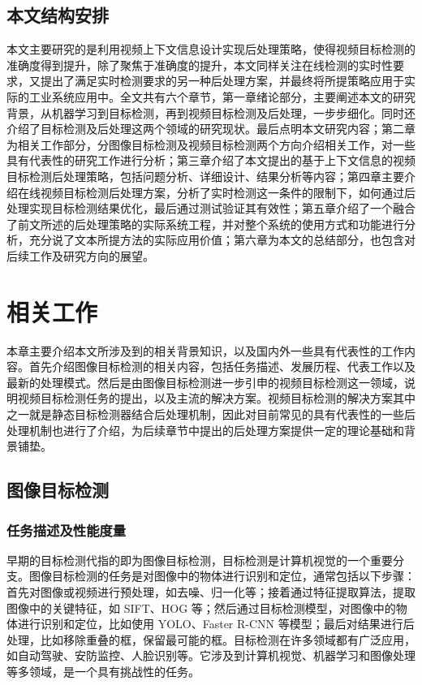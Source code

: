 \documentclass[winfonts,master,twoside,AutoFakeBold= {2}]{njuthesis}
\begin{document}
\section{本文结构安排}
本文主要研究的是利用视频上下文信息设计实现后处理策略，使得视频目标检测的准确度得到提升，除了聚焦于准确度的提升，本文同样关注在线检测的实时性要求，又提出了满足实时检测要求的另一种后处理方案，并最终将所提策略应用于实际的工业系统应用中。全文共有六个章节，第一章绪论部分，主要阐述本文的研究背景，从机器学习到目标检测，再到视频目标检测及后处理，一步步细化。同时还介绍了目标检测及后处理这两个领域的研究现状。最后点明本文研究内容；第二章为相关工作部分，分图像目标检测及视频目标检测两个方向介绍相关工作，对一些具有代表性的研究工作进行分析；第三章介绍了本文提出的基于上下文信息的视频目标检测后处理策略，包括问题分析、详细设计、结果分析等内容；第四章主要介绍在线视频目标检测后处理方案，分析了实时检测这一条件的限制下，如何通过后处理实现目标检测结果优化，最后通过测试验证其有效性；第五章介绍了一个融合了前文所述的后处理策略的实际系统工程，并对整个系统的使用方式和功能进行分析，充分说了文本所提方法的实际应用价值；第六章为本文的总结部分，也包含对后续工作及研究方向的展望。

\chapter{相关工作}
本章主要介绍本文所涉及到的相关背景知识，以及国内外一些具有代表性的工作内容。首先介绍图像目标检测的相关内容，包括任务描述、发展历程、代表工作以及最新的处理模式。然后是由图像目标检测进一步引申的视频目标检测这一领域，说明视频目标检测任务的提出，以及主流的解决方案。视频目标检测的解决方案其中之一就是静态目标检测器结合后处理机制，因此对目前常见的具有代表性的一些后处理机制也进行了介绍，为后续章节中提出的后处理方案提供一定的理论基础和背景铺垫。 
\section{图像目标检测}
\subsection{任务描述及性能度量}
早期的目标检测代指的即为图像目标检测，目标检测是计算机视觉的一个重要分支。图像目标检测的任务是对图像中的物体进行识别和定位，通常包括以下步骤：首先对图像或视频进行预处理，如去噪、归一化等；接着通过特征提取算法，提取图像中的关键特征，如 SIFT、HOG 等；然后通过目标检测模型，对图像中的物体进行识别和定位，比如使用 YOLO、Faster R-CNN 等模型；最后对结果进行后处理，比如移除重叠的框，保留最可能的框。目标检测在许多领域都有广泛应用，如自动驾驶、安防监控、人脸识别等。它涉及到计算机视觉、机器学习和图像处理等多领域，是一个具有挑战性的任务。
\end{document}
